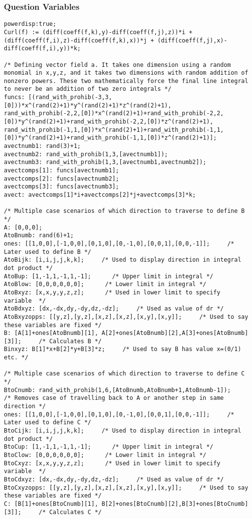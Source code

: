\documentclass[a4paper,10pt]{article}
\begin{document}
\subsubsection{Question Variables}
\begin{lstlisting}
powerdisp:true;
Curl(f) := (diff(coeff(f,k),y)-diff(coeff(f,j),z))*i + (diff(coeff(f,i),z)-diff(coeff(f,k),x))*j + (diff(coeff(f,j),x)-diff(coeff(f,i),y))*k;

/* Defining vector field a. It takes one dimension using a random monomial in x,y,z, and it takes two dimensions with random addition of nonzero powers. These two mathematically force the final line integral to never be an addition of two zero integrals */
funcs: [(rand_with_prohib(-3,3,[0]))*x^(rand(2)+1)*y^(rand(2)+1)*z^(rand(2)+1), rand_with_prohib(-2,2,[0])*x^(rand(2)+1)+rand_with_prohib(-2,2,[0])*y^(rand(2)+1)+rand_with_prohib(-2,2,[0])*z^(rand(2)+1), rand_with_prohib(-1,1,[0])*x^(rand(2)+1)+rand_with_prohib(-1,1,[0])*y^(rand(2)+1)+rand_with_prohib(-1,1,[0])*z^(rand(2)+1)];
avectnumb1: rand(3)+1;
avectnumb2: rand_with_prohib(1,3,[avectnumb1]);
avectnumb3: rand_with_prohib(1,3,[avectnumb1,avectnumb2]);
avectcomps[1]: funcs[avectnumb1];
avectcomps[2]: funcs[avectnumb2];
avectcomps[3]: funcs[avectnumb3];
avect: avectcomps[1]*i+avectcomps[2]*j+avectcomps[3]*k;

/* Multiple case scenarios of which direction to traverse to define B */
A: [0,0,0];
AtoBnumb: rand(6)+1;
ones: [[1,0,0],[-1,0,0],[0,1,0],[0,-1,0],[0,0,1],[0,0,-1]];     /* Later used to define B */
AtoBijk: [i,i,j,j,k,k];     /* Used to display direction in integral dot product */
AtoBup: [1,-1,1,-1,1,-1];      /* Upper limit in integral */
AtoBlow: [0,0,0,0,0,0];      /* Lower limit in integral */
AtoBxyz: [x,x,y,y,z,z];      /* Used in lower limit to specify variable  */
AtoBdxyz: [dx,-dx,dy,-dy,dz,-dz];     /* Used as value of dr */
AtoBxyzopps: [[y,z],[y,z],[x,z],[x,z],[x,y],[x,y]];     /* Used to say these variables are fixed */
B: [A[1]+ones[AtoBnumb][1], A[2]+ones[AtoBnumb][2],A[3]+ones[AtoBnumb][3]];     /* Calculates B */
Binxyz: B[1]*x+B[2]*y+B[3]*z;     /* Used to say B has value x=(0/1) etc. */

/* Multiple case scenarios of which direction to traverse to define C */
BtoCnumb: rand_with_prohib(1,6,[AtoBnumb,AtoBnumb+1,AtoBnumb-1]);     /* Removes case of travelling back to A or another step in same direction */
ones: [[1,0,0],[-1,0,0],[0,1,0],[0,-1,0],[0,0,1],[0,0,-1]];     /* Later used to define C */
BtoCijk: [i,i,j,j,k,k];     /* Used to display direction in integral dot product */
BtoCup: [1,-1,1,-1,1,-1];      /* Upper limit in integral */
BtoClow: [0,0,0,0,0,0];      /* Lower limit in integral */
BtoCxyz: [x,x,y,y,z,z];      /* Used in lower limit to specify variable  */
BtoCdxyz: [dx,-dx,dy,-dy,dz,-dz];     /* Used as value of dr */
BtoCxyzopps: [[y,z],[y,z],[x,z],[x,z],[x,y],[x,y]];     /* Used to say these variables are fixed */
C: [B[1]+ones[BtoCnumb][1], B[2]+ones[BtoCnumb][2],B[3]+ones[BtoCnumb][3]];     /* Calculates C */


\end{lstlisting}
\end{document}
